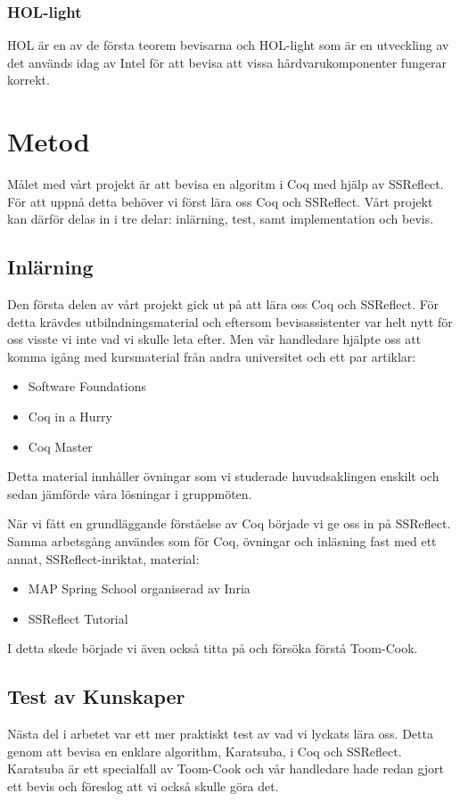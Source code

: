 \documentclass[a4paper]{article}
\begin{document}
\subsubsection{HOL-light}
HOL är en av de första teorem bevisarna och HOL-light som är en utveckling av
det används idag av Intel för att bevisa att vissa hårdvarukomponenter fungerar
korrekt.
\section{Metod}
Målet med vårt projekt är att bevisa en algoritm i Coq med hjälp av SSReflect.
För att uppnå detta behöver vi först lära oss Coq och SSReflect. Vårt projekt
kan därför delas in i tre delar: inlärning, test, samt implementation och
bevis.

\subsection{Inlärning}
Den första delen av vårt projekt gick ut på att lära oss Coq och SSReflect. För
detta krävdes utbilndningsmaterial och eftersom bevisassistenter var helt nytt
för oss visste vi inte vad vi skulle leta efter. Men vår handledare hjälpte oss
att komma igång med kursmaterial från andra universitet och ett par artiklar:
\begin{itemize}
  \item Software Foundations
  \item Coq in a Hurry
  \item Coq Master
\end{itemize}
Detta material innhåller övningar som vi studerade huvudsaklingen enskilt och
sedan jämförde våra lösningar i gruppmöten.

När vi fått en grundläggande förståelse av Coq började vi ge oss in på
SSReflect. Samma arbetsgång användes som för Coq, övningar och inläsning fast
med ett annat, SSReflect-inriktat, material:
\begin{itemize}
  \item MAP Spring School organiserad av Inria
  \item SSReflect Tutorial
\end{itemize}
I detta skede började vi även också titta på och försöka förstå Toom-Cook.

\subsection{Test av Kunskaper}
Nästa del i arbetet var ett mer praktiskt test av vad vi lyckats lära oss.
Detta genom att bevisa en enklare algorithm, Karatsuba, i Coq och SSReflect.
Karatsuba är ett specialfall av Toom-Cook och vår handledare hade redan gjort
ett bevis och föreslog att vi också skulle göra det.
\end{document}
